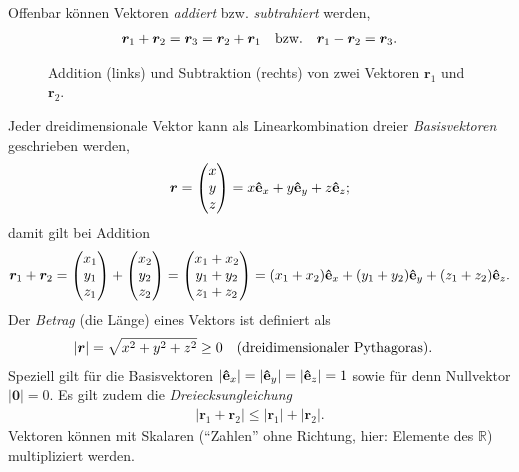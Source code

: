 Offenbar können Vektoren \emph{addiert} bzw. \emph{subtrahiert} werden, 
\begin{align}
    \bm{r}_1 + \bm{r}_2 = \bm{r}_3 = \bm{r}_2 + \bm{r}_1 \qq{bzw.} \bm{r}_1 - \bm{r}_2 = \bm{r}_3.
\end{align} 
\begin{figure}[htp]
    \centering
    \caption{Addition (links) und Subtraktion (rechts) von zwei Vektoren $\bm{r}_1$ und $\bm{r}_2$.}
\end{figure}

Jeder dreidimensionale Vektor kann als Linearkombination dreier \emph{Basisvektoren} geschrieben werden, 
\begin{align}
    \bm{r} = \mqty(x\\y\\z) = x \vu{e}_x + y \vu{e}_y + z \vu{e}_z;
\end{align}
damit gilt bei Addition 
\begin{align}
    \bm{r}_1 + \bm{r}_2 = \mqty(x_1\\y_1\\z_1) + \mqty(x_2\\y_2\\z_2) = \mqty(x_1+x_2\\y_1+y_2\\z_1+z_2) = (x_1+x_2)\vu{e}_x + (y_1+y_2)\vu{e}_y + (z_1+z_2)\vu{e}_z.
\end{align}
Der \emph{Betrag} (die Länge) eines Vektors ist definiert als 
\begin{align}
    |\bm{r}| = \sqrt{x^2+y^2+z^2} \ge 0 \qq{(dreidimensionaler Pythagoras).}
\end{align}
Speziell gilt für die Basisvektoren $|\vu{e}_x| = |\vu{e}_y| = |\vu{e}_z| = 1$ sowie für denn Nullvektor $|\bm{0}| = 0$. Es gilt zudem die \emph{Dreiecksungleichung}
\begin{align}
    |\bm{r}_1 + \bm{r}_2| \le |\bm{r}_1| + |\bm{r}_2|. 
\end{align} 
Vektoren können mit Skalaren (``Zahlen'' ohne Richtung, hier: Elemente des $\mathbb{R}$) multipliziert werden. 


